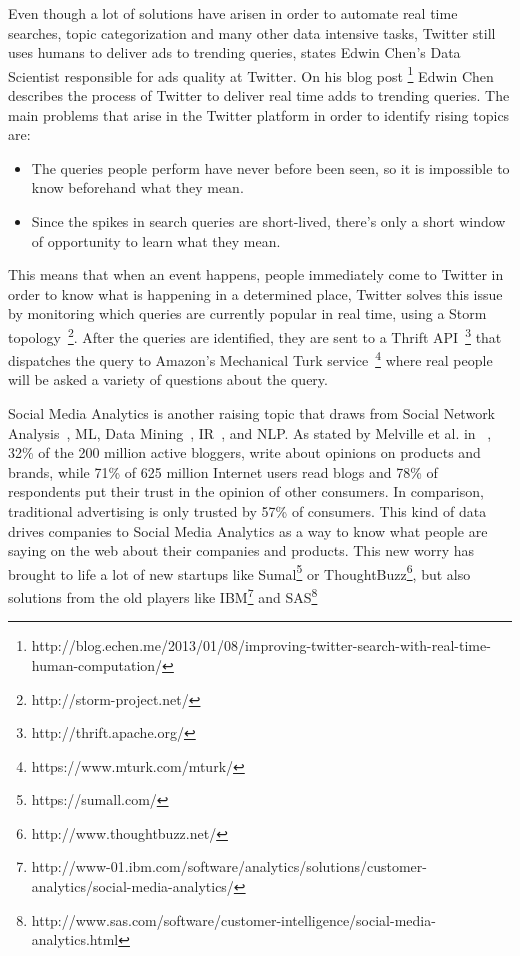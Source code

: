 Even though a lot of solutions have arisen in order to automate real time searches, topic categorization and many other data intensive tasks, Twitter still uses humans to deliver ads to trending queries, states Edwin Chen's Data Scientist responsible for ads quality at Twitter. On his blog post \footnote{http://blog.echen.me/2013/01/08/improving-twitter-search-with-real-time-human-computation/} Edwin Chen describes the process of Twitter to deliver real time adds to trending queries. The main problems that arise in the Twitter platform in order to identify rising topics are:
\begin{itemize}
  \item The queries people perform have never before been seen, so it is impossible to know beforehand what they mean.
  \item Since the spikes in search queries are short-lived, there's only a short window of opportunity to learn what they mean.
\end{itemize}
This means that when an event happens, people immediately come to Twitter in order to know what is happening in a determined place, Twitter solves this issue by monitoring which queries are currently popular in real time, using a Storm topology~\footnote{http://storm-project.net/}. After the queries are identified, they are sent to a Thrift API~\footnote{http://thrift.apache.org/} that dispatches the query to Amazon's Mechanical Turk service~\footnote{https://www.mturk.com/mturk/} where real people will be asked a variety of questions about the query.

Social Media Analytics is another raising topic that draws from Social Network Analysis~\cite{knoke2008social}, \ac{ML}, Data Mining~\cite{witten2005data}, \ac{IR}~\cite{salton1983introduction}, and \ac{NLP}. As stated by Melville et al. in ~\cite{Melville2009}, 32\% of the 200 million active bloggers, write about opinions on products and brands, while 71\% of 625 million Internet users read blogs and 78\% of respondents put their trust in the opinion of other consumers. In comparison, traditional advertising is only trusted by 57\% of consumers.
This kind of data drives companies to Social Media Analytics as a way to know what people are saying on the web about their companies and products. This new worry has brought to life a lot of new startups like Sumal\footnote{https://sumall.com/} or ThoughtBuzz\footnote{http://www.thoughtbuzz.net/}, but also solutions from the old players like IBM\footnote{http://www-01.ibm.com/software/analytics/solutions/customer-analytics/social-media-analytics/} and SAS\footnote{http://www.sas.com/software/customer-intelligence/social-media-analytics.html}

